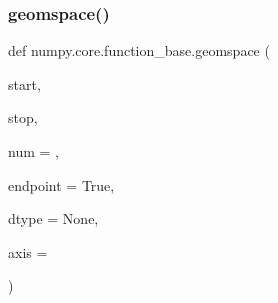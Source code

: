 \subsubsection{\texorpdfstring{geomspace()}{geomspace()}}
{\footnotesize\ttfamily def numpy.\+core.\+function\+\_\+base.\+geomspace (\begin{DoxyParamCaption}\item[{}]{start,  }\item[{}]{stop,  }\item[{}]{num = {},  }\item[{}]{endpoint = {\ttfamily True},  }\item[{}]{dtype = {\ttfamily None},  }\item[{}]{axis = {} }\end{DoxyParamCaption})}

